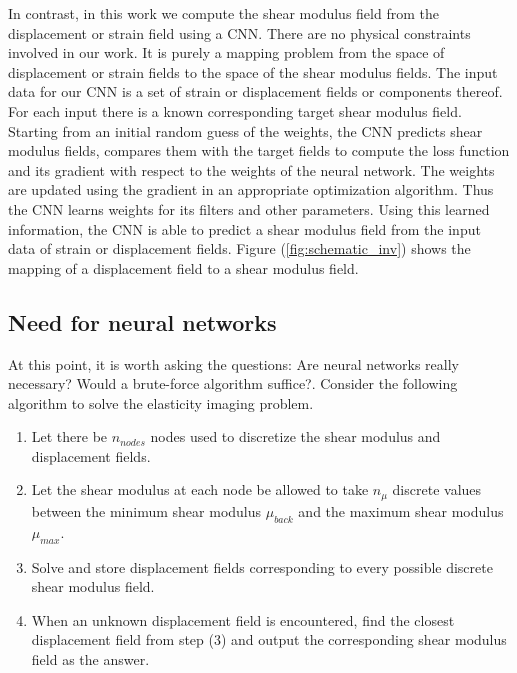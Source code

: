\documentclass[12pt]{article}
\begin{document}
In contrast, in this work we compute the shear modulus field from the displacement or strain field using a CNN. There are no physical constraints involved in our work. It is purely a mapping problem from the space of displacement or strain fields to the space of the shear modulus fields. The input data for our CNN is a set of strain or displacement fields or components thereof. For each input there is a known corresponding target shear modulus field. Starting from an initial random guess of the weights, the CNN predicts shear modulus fields, compares them with the target fields to compute the loss function and its gradient with respect to the weights of the neural network. The weights are updated using the gradient in an appropriate optimization algorithm. Thus the CNN learns weights for its filters and other parameters. Using this learned information, the CNN is able to predict a shear modulus field from the input data of strain or displacement fields. Figure (\ref{fig:schematic_inv}) shows the mapping of a displacement field to a shear modulus field.\\
\subsection{Need for neural networks}
At this point, it is worth asking the questions: Are neural networks really necessary? Would a brute-force algorithm suffice?. Consider the following algorithm to solve the elasticity imaging problem.
%
\begin{enumerate}
\item{Let there be $n_{nodes}$ nodes used to discretize the shear modulus and displacement fields.}
\item{Let the shear modulus at each node be allowed to take $n_{\mu}$ discrete values between the minimum shear modulus $\mu_{back}$ and the maximum shear modulus $\mu_{max}$.}
\item{Solve and store displacement fields corresponding to every possible discrete shear modulus field.}
\item{When an unknown displacement field is encountered, find the closest displacement field from step (3) and output the corresponding shear modulus field as the answer.}
\end{enumerate}
\end{document}
